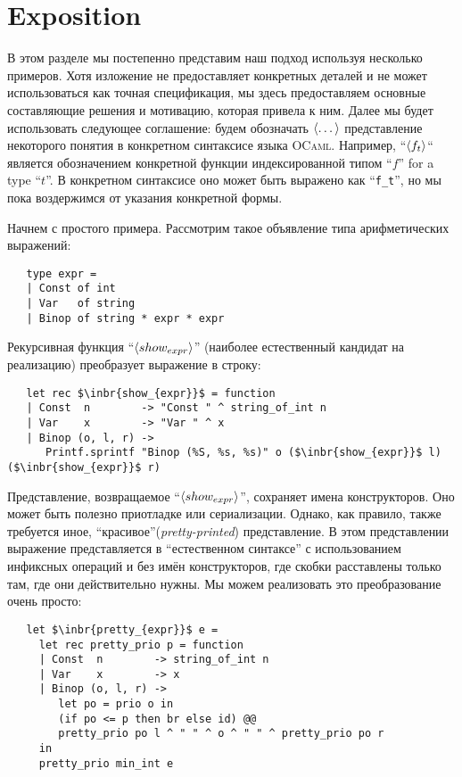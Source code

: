 \section{Exposition}
\label{expo}

В этом разделе мы постепенно представим наш подход используя несколько примеров. 
Хотя изложение не предоставляет конкретных деталей и не может использоваться как точная спецификация,
мы здесь предоставляем основные составляющие решения и мотивацию, которая привела к ним.
Далее мы будет использовать следующее соглашение: будем обозначать $\left<\dots\right>$ представление некоторого понятия в конкретном синтаксисе языка \textsc{OCaml}. Например, ``$\left<f_t\right>$`` является обозначением конкретной функции индексированной типом  ``$f$'' for a type ``$t$''. 
В конкретном синтаксисе оно может быть выражено как ``\lstinline{f_t}'', но мы пока воздержимся от указания конкретной формы.

Начнем с простого примера. Рассмотрим такое объявление типа арифметических выражений:

\begin{lstlisting}
   type expr =
   | Const of int
   | Var   of string
   | Binop of string * expr * expr
\end{lstlisting}

Рекурсивная функция ``$\left<show_{expr}\right>$'' (наиболее естественный кандидат на реализацию)
преобразует выражение в строку: 

\begin{lstlisting}
   let rec $\inbr{show_{expr}}$ = function
   | Const  n        -> "Const " ^ string_of_int n
   | Var    x        -> "Var " ^ x
   | Binop (o, l, r) ->
      Printf.sprintf "Binop (%S, %s, %s)" o ($\inbr{show_{expr}}$ l) ($\inbr{show_{expr}}$ r)
\end{lstlisting}

Представление, возвращаемое ``$\left<show_{expr}\right>$'', сохраняет имена конструкторов. Оно может быть
полезно приотладке или сериализации. Однако, как правило, также требуется иное, ``красивое''(\emph{pretty-printed}) представление. 
В этом представлении выражение представляется в ``естественном синтаксе'' с использованием инфиксных операций и без имён 
конструкторов, где скобки расставлены только там, где они действительно нужны. Мы можем реализовать это преобразование 
очень просто:

\begin{lstlisting}
   let $\inbr{pretty_{expr}}$ e =
     let rec pretty_prio p = function
     | Const  n        -> string_of_int n
     | Var    x        -> x
     | Binop (o, l, r) ->
        let po = prio o in
        (if po <= p then br else id) @@
        pretty_prio po l ^ " " ^ o ^ " " ^ pretty_prio po r
     in
     pretty_prio min_int e
\end{lstlisting}

